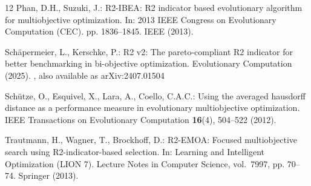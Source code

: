 \documentclass[runningheads]{llncs}
\begin{document}
\begin{thebibliography}{12}
Phan, D.H., Suzuki, J.: {R2-IBEA}: {R2} indicator based evolutionary algorithm
  for multiobjective optimization. In: 2013 IEEE Congress on Evolutionary
  Computation (CEC). pp. 1836--1845. IEEE (2013).

Sch{\"a}permeier, L., Kerschke, P.: {R2 v2}: The pareto-compliant {R2}
  indicator for better benchmarking in bi-objective optimization. Evolutionary
  Computation  (2025). , also available as
  arXiv:2407.01504

Sch{\"u}tze, O., Esquivel, X., Lara, A., Coello, C.A.C.: Using the averaged
  hausdorff distance as a performance measure in evolutionary multiobjective
  optimization. IEEE Transactions on Evolutionary Computation  \textbf{16}(4),
  504--522 (2012). 

Trautmann, H., Wagner, T., Brockhoff, D.: {R2-EMOA}: Focused multiobjective
  search using {R2}-indicator-based selection. In: Learning and Intelligent
  Optimization (LION 7). Lecture Notes in Computer Science, vol.~7997, pp.
  70--74. Springer (2013). 

\end{thebibliography}
\end{document}
